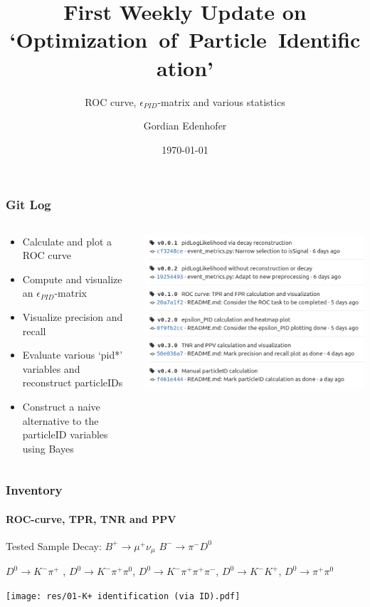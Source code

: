 \documentclass{beamer}
\title{First Weekly Update on `Optimization~of~Particle~Identification'}
\subtitle{ROC curve, $\epsilon_{PID}$-matrix and various statistics}
\author{Gordian Edenhofer}
\date{\today}
\begin{document}
\begin{frame}
	\frametitle{Git Log}

	\begin{columns}[T]
		\begin{column}{.5\textwidth}
			\begin{itemize}
				\item Calculate and plot a ROC curve
				\item Compute and visualize an $\epsilon_{PID}$-matrix
				\item Visualize precision and recall
				\item Evaluate various `pid*' variables and reconstruct particleIDs
				\item Construct a naive alternative to the particleID variables using Bayes
			\end{itemize}
		\end{column}
		\begin{column}{.5\textwidth}
			\includegraphics[width=1\linewidth]{res/01-git tags.png}
		\end{column}
	\end{columns}
\end{frame}

\begin{frame}
	\frametitle{Inventory}
	\framesubtitle{ROC-curve, TPR, TNR and PPV}

	Tested Sample Decay: \hspace{2em}
	$B^+ \rightarrow \mu^+ \nu_{\mu}$
	\hspace{2em}
	$B^- \rightarrow \pi^- D^0$
	\\
	\begin{addmargin}[1em]{0em}
		$D^0 \rightarrow K^- \pi^+$ ,
		$D^0 \rightarrow K^- \pi^+ \pi^0$,
		$D^0 \rightarrow K^- \pi^+ \pi^+ \pi^-$,
		$D^0 \rightarrow K^- K^+$,
		$D^0 \rightarrow \pi^+ \pi^0$
	\end{addmargin}

	\vspace{1em}

	\centering
	\texttt{[image: res/01-K+ identification (via ID).pdf]}
\end{frame}
\end{document}
